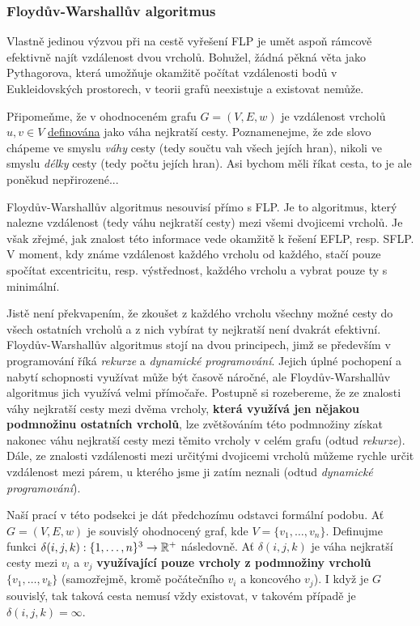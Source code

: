 \subsubsection{Floydův-Warshallův algoritmus}
\label{sssec:floyduv-warshalluv-algoritmus}

Vlastně jedinou výzvou při na cestě vyřešení FLP je umět aspoň rámcově efektivně
najít vzdálenost dvou vrcholů. Bohužel, žádná pěkná věta jako Pythagorova, která
umožňuje okamžitě počítat vzdálenosti bodů v Eukleidovských prostorech, v teorii
grafů neexistuje a existovat nemůže.

Připomeňme, že v ohodnoceném grafu $G = (V,E,w)$ je vzdálenost vrcholů $u,v \in
V$ \hyperref[def:vzdalenost-v-grafu]{definována} jako váha nejkratší cesty.
Poznamenejme, že zde slovo  chápeme ve smyslu \emph{váhy} cesty
(tedy součtu vah všech jejích hran), nikoli ve smyslu \emph{délky} cesty (tedy
počtu jejích hran). Asi bychom měli říkat  cesta, to je ale poněkud
nepřirozené...

Floydův-Warshallův algoritmus nesouvisí přímo s FLP. Je to algoritmus, který
nalezne vzdálenost (tedy váhu nejkratší cesty) mezi všemi dvojicemi vrcholů. Je
však zřejmé, jak znalost této informace vede okamžitě k řešení EFLP, resp. SFLP.
V moment, kdy známe vzdálenost každého vrcholu od každého, stačí pouze spočítat
excentricitu, resp. výstřednost, každého vrcholu a vybrat pouze ty s minimální.

Jistě není překvapením, že zkoušet z každého vrcholu všechny možné cesty do
všech ostatních vrcholů a z nich vybírat ty nejkratší není dvakrát efektivní.
Floydův-Warshallův algoritmus stojí na dvou principech, jimž se především v
programování říká \emph{rekurze} a \emph{dynamické programování}. Jejich úplné
pochopení a nabytí schopnosti využívat může být časově náročné, ale
Floydův-Warshallův algoritmus jich využívá velmi přímočaře. Postupně si
rozebereme, že ze znalosti váhy nejkratší cesty mezi dvěma vrcholy,
\textbf{která využívá jen nějakou podmnožinu ostatních vrcholů}, lze zvětšováním
této podmnožiny získat nakonec váhu nejkratší cesty mezi těmito vrcholy v celém
grafu (odtud \emph{rekurze}). Dále, ze znalosti vzdálenosti mezi určitými
dvojicemi vrcholů můžeme rychle určit vzdálenost mezi párem, u kterého jsme ji
zatím neznali (odtud \emph{dynamické programování}).

Naší prací v této podsekci je dát předchozímu odstavci formální podobu. Ať $G =
(V,E,w)$ je souvislý ohodnocený graf, kde $V = \{v_1,\ldots,v_n\}$. Definujme
funkci $\delta(i,j,k): \{1,\ldots,n\}^3 \to \mathbb{R}^+$ následovně. Ať $\delta(i,j,k)$
je váha nejkratší cesty mezi $v_i$ a $v_j$ \textbf{využívající pouze vrcholy z
podmnožiny vrcholů} $\{v_1,\ldots,v_k\}$ (samozřejmě, kromě počátečního $v_i$ a
koncového $v_j$). I když je $G$ souvislý, tak taková cesta nemusí vždy
existovat, v takovém případě je $\delta(i,j,k) = \infty$.

